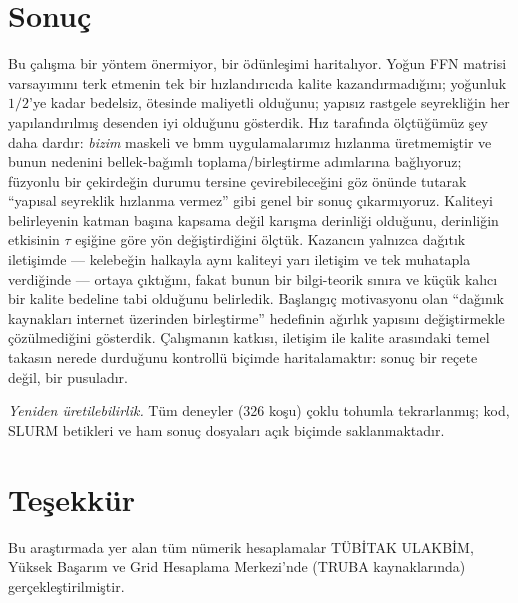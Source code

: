 \documentclass[10pt,journal]{IEEEtran}
\begin{document}
\section{Sonuç}
Bu çalışma bir yöntem önermiyor, bir ödünleşimi haritalıyor. Yoğun FFN matrisi varsayımını
terk etmenin tek bir hızlandırıcıda kalite kazandırmadığını; yoğunluk $1/2$'ye kadar
bedelsiz, ötesinde maliyetli olduğunu; yapısız rastgele seyrekliğin her yapılandırılmış desenden
iyi olduğunu gösterdik. Hız tarafında ölçtüğümüz şey daha dardır: \emph{bizim} maskeli ve bmm
uygulamalarımız hızlanma üretmemiştir ve bunun nedenini bellek-bağımlı toplama/birleştirme
adımlarına bağlıyoruz; füzyonlu bir çekirdeğin durumu tersine çevirebileceğini
\cite{dao2022} göz önünde tutarak ``yapısal seyreklik hızlanma vermez'' gibi genel bir
sonuç çıkarmıyoruz. Kaliteyi belirleyenin katman başına kapsama değil karışma derinliği
olduğunu, derinliğin etkisinin $\tau$ eşiğine göre yön değiştirdiğini ölçtük. Kazancın
yalnızca dağıtık iletişimde --- kelebeğin halkayla aynı
kaliteyi yarı iletişim ve tek muhatapla verdiğinde --- ortaya çıktığını, fakat bunun bir
bilgi-teorik sınıra ve küçük kalıcı bir kalite bedeline tabi olduğunu belirledik. Başlangıç
motivasyonu olan ``dağınık kaynakları internet üzerinden birleştirme'' hedefinin ağırlık
yapısını değiştirmekle çözülmediğini gösterdik. Çalışmanın katkısı, iletişim ile kalite
arasındaki temel takasın nerede durduğunu kontrollü biçimde haritalamaktır: sonuç bir reçete
değil, bir pusuladır.

\emph{Yeniden üretilebilirlik.} Tüm deneyler (326 koşu) çoklu tohumla tekrarlanmış; kod, SLURM
betikleri ve ham sonuç dosyaları açık biçimde saklanmaktadır.

\section*{Teşekkür}
Bu araştırmada yer alan tüm nümerik hesaplamalar TÜBİTAK ULAKBİM, Yüksek Başarım ve Grid
Hesaplama Merkezi'nde (TRUBA kaynaklarında) gerçekleştirilmiştir.
\end{document}
